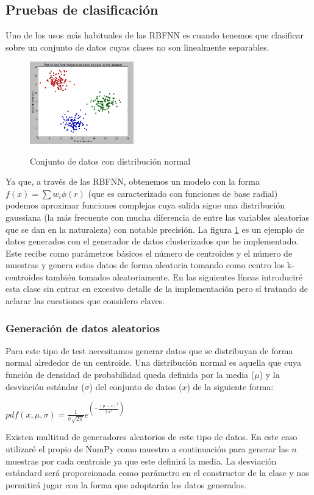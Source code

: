 \documentclass[10pt,a4paper, twocolumn]{report}
\begin{document}
\subsection{Pruebas de clasificación}
Uno de los usos más habituales de las RBFNN es cuando tenemos que clasificar sobre un conjunto de datos cuyas clases no son linealmente separables.
\begin{figure}[!h]{}
    \centering
    \includegraphics[width=0.4\textwidth]{img/clusteredData1.png}
    \label{fig:clusteredData1}
    \caption{Conjunto de datos con distribución normal}
\end{figure}
Ya que, a través de las RBFNN, obtenemos un modelo con la forma $f(x)=\sum w_{i}\phi(r)$ (que es caracterizado con funciones de base radial) podemos aproximar funciones complejas cuya salida sigue una distribución gaussiana (la más frecuente con mucha diferencia de entre las variables aleatorias que se dan en la naturaleza) con notable precisión. 
La figura \ref{fig:clusteredData1} es un ejemplo de datos generados con el generador de datos clusterizados que he implementado. Este recibe como parámetros básicos el número de centroides y el número de muestras y genera estos datos de forma aleatoria tomando como centro los k-centroides también tomados aleatoriamente. En las siguientes líneas introduciré esta clase sin entrar en excesivo detalle de la implementación pero sí tratando de aclarar las cuestiones que considero claves.

\subsubsection{Generación de datos aleatorios}
Para este tipo de test necesitamos generar datos que se distribuyan de forma normal alrededor de un centroide. Una distribución normal es aquella que cuya función de densidad de probabilidad queda definida por la media ($\mu$) y la desviación estándar ($\sigma$) del conjunto de datos ($x$) de la siguiente forma:
\begin{center}
$pdf(x,\mu,\sigma) = \frac{1}{ \sigma \sqrt{2 \pi}} e^{\left(-\frac{{\left(\mu - x\right)}^{2}}{2 \, \sigma^{2}}\right)}$
\end{center} 
Existen multitud de generadores aleatorios de este tipo de datos. En este caso utilizaré el propio de NumPy como muestro a continuación para generar las $n$ muestras por cada centroide ya que este definirá la media. La desviación estándard será proporcionada como parámetro en el constructor de la clase y nos permitirá jugar con la forma que adoptarán los datos generados.
\end{document}
